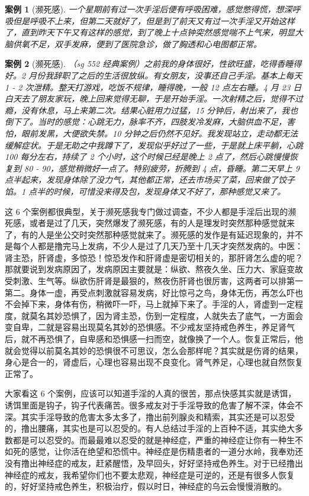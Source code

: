 \documentclass{ctexart}
\newtheorem{case}{案例}
\begin{document}
\begin{case}[濒死感]
    一个星期前有过一次手淫后便有呼吸困难，感觉憋得慌，想深呼吸但是呼吸不上来，但第二天就好了，但是到了前天又有过一次手淫又开始这样了，直到昨天下午又有这样的感觉，到了晚上十点钟突然感觉喘不上气来，明显大脑供氧不足，双手发麻，便到了医院急诊，做了胸透和心电图都正常。
\end{case}

\begin{case}[濒死感]
    （sg 552 经典案例）之前我的身体很好，性欲旺盛，吃得香睡得好。2 月份我辞职了之后的生活很放纵。有女朋友，没事还自己手淫。基本上每天 1 - 2 次泄精。整天打游戏，吃饭不规律，睡得晚，一般 12 点左右睡。4 月 23 日白天去了朋友家玩，晚上回来觉得无聊，于是开始手淫。一次射精之后，觉得不过瘾，没有休息，马上来第二次。结果心脏用力过猛，15 分钟后，射出来了，我也倒下了。当时的感觉：心跳无力，脉率不齐，四肢发冷发麻，大脑供血不足，害怕，眼前发黑，大便欲失禁。10 分钟之后仍然不见好。我发现站立，走动都无法缓解症状。于是无助之中我蹲下了，发现似乎好过了一些，于是就上床平躺，心跳 100 每分左右，持续了 2 个小时，这个时候已经是晚上 2 点了，然后心跳慢慢恢复到 80 - 90，感觉稍微好一点了。特别疲劳，折腾到 4 点，昏睡。第二天早上 9 点半起来，发现身体除了没力气，其他都正常，还去市场买了菜，回来做了饺子馅。1 点半的时候，可惜没来得及包，发现身体又不好了，那种感觉又来了。
\end{case}

这 6 个案例都很典型，关于濒死感我专门做过调查，不少人都是手淫后出现的濒死感，或者是过了几天，突然爆发了濒死感，有的人是理发时突然那种感觉就来了，有的人是坐公交时突然那种感觉就来了。濒死感的发作是有延迟现象的，并不是每个人都是撸完马上发病，不少人是过了几天乃至十几天才突然发病的。中医：肾主恐，肝肾虚，多惊恐！惊恐发作和肝肾虚是密切相关的，那肝肾怎么虚的呢？那就要说到发病原因了，发病原因主要就是：纵欲、熬夜久坐、压力大、家庭变故受刺激、生气等。纵欲伤肝肾是最狠的，熬夜伤肝肾也很厉害，这两者可以排第一第二。身体一虚，再受点刺激就容易发病，好比惊弓之鸟，身体无伤，再怎么吓也不会掉下来，身体有伤，稍微吓一吓，马上就掉下来了。手淫的人，肾虚到一定程度，就莫名其妙恐惧了，因为肾主恐，伤到一定程度，人就失去了底气，一方面会变自卑，二就是容易出现莫名其妙的恐惧感。不少戒友坚持戒色养生，养足肾气后，就不再恐惧了，自卑感和恐惧感一扫而空，就像换了一个人。恢复正常后，他就会觉得以前莫名其妙的恐惧很不可思议，怎么会那样呢？其实就是伤肾的结果，身心是合一的，肾虚后，心理也容易出现不良变化。肾气养足，心理也就自然恢复正常了。

大家看这 6 个案例，应该可以知道手淫的人真的很苦，那点快感其实就是诱饵，诱饵里面是钩子，钩子代表痛苦。很多戒友对于手淫导致的危害了解不深，体会不深。其实手淫导致的危害太多太多了，撸出前列腺炎和精索，其实还是可以忍受的，撸出腰痛，其实也是可以忍受的。有人总结过手淫的上百种不适，其实绝大多数都是可以忍受的。而最最难以忍受的就是神经症，严重的神经症让你有一种生不如死的感觉，让你活在绝望和恐慌中。神经症是伤精患者的一道分水岭，我奉劝还没有撸出神经症的戒友，赶紧醒悟，及早回头，好好坚持戒色养生。对于已经撸出神经症的戒友，我希望你们也不要太悲观，神经症是可逆的，还是有很多人恢复的，好好坚持戒色养生，积极治疗，假以时日，神经症的乌云会慢慢消散的。
\end{document}
